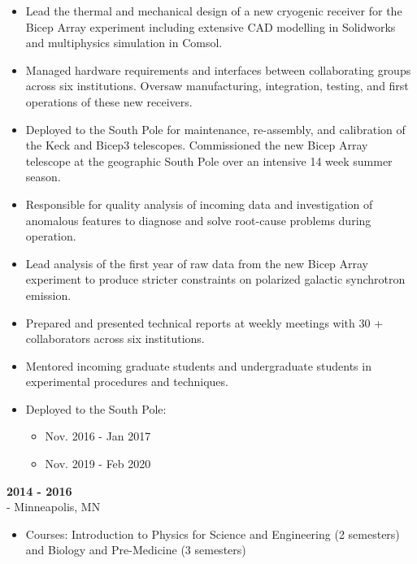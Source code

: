 \documentclass[10pt]{article}
\begin{document}
	\begin{itemize}[noitemsep,topsep=0pt]
		\item{Lead the thermal and mechanical design of a new cryogenic receiver for the Bicep Array experiment including extensive CAD modelling in Solidworks and multiphysics simulation in Comsol.}
		\item{Managed hardware requirements and interfaces between collaborating groups across six institutions. Oversaw manufacturing, integration, testing, and first operations of these new receivers.}
		\item{Deployed to the South Pole for maintenance, re-assembly, and calibration of the Keck and Bicep3 telescopes. Commissioned the new Bicep Array telescope at the geographic South Pole over an intensive 14 week summer season.}
		\item{Responsible for quality analysis of incoming data and investigation of anomalous features to diagnose and solve root-cause problems during operation.}
		\item{Lead analysis of the first year of raw data from the new Bicep Array experiment to produce stricter constraints on polarized galactic synchrotron emission. }
		\item{Prepared and presented technical reports at weekly meetings with 30 + collaborators across six institutions.}
		\item{Mentored incoming graduate students and undergraduate students in experimental procedures and techniques.}		
		\item{Deployed to the South Pole:}
		
			\begin{itemize}[noitemsep,topsep=0pt]
				\item{Nov. 2016 - Jan 2017}
				\item{Nov. 2019 - Feb 2020}
			\end{itemize}
	\end{itemize}
	
	 \hspace{\fill} {\bf 2014 - 2016}  \\
	 - Minneapolis, MN
	
	\begin{itemize}[noitemsep,topsep=0pt]
	\item{Courses: Introduction to Physics for Science and Engineering (2 semesters) and Biology and Pre-Medicine (3 semesters)}
	\end{itemize}
	
\end{document}
